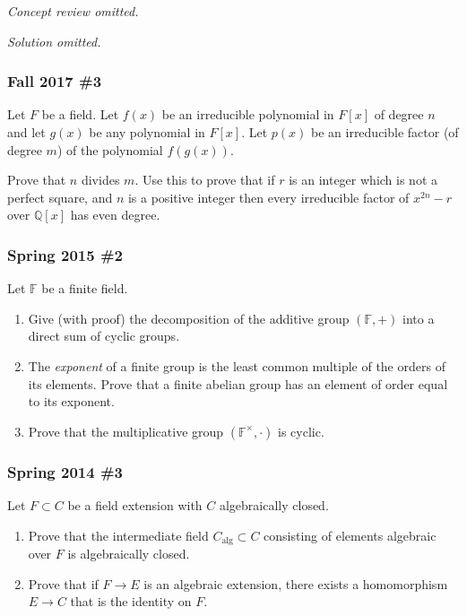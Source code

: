 \emph{Concept review omitted.}

\emph{Solution omitted.}

\hypertarget{fall-2017-3}{%
\subsubsection{Fall 2017 \#3}\label{fall-2017-3}}

Let \(F\) be a field. Let \(f(x)\) be an irreducible polynomial in
\(F[x]\) of degree \(n\) and let \(g(x)\) be any polynomial in \(F[x]\).
Let \(p(x)\) be an irreducible factor (of degree \(m\)) of the
polynomial \(f(g(x))\).

Prove that \(n\) divides \(m\). Use this to prove that if \(r\) is an
integer which is not a perfect square, and \(n\) is a positive integer
then every irreducible factor of \(x^{2n} - r\) over \({\mathbb{Q}}[x]\)
has even degree.

\hypertarget{spring-2015-2}{%
\subsubsection{Spring 2015 \#2}\label{spring-2015-2}}

Let \({\mathbb{F}}\) be a finite field.

\begin{enumerate}
\def\labelenumi{\alph{enumi}.}
\item
  Give (with proof) the decomposition of the additive group
  \(({\mathbb{F}}, +)\) into a direct sum of cyclic groups.
\item
  The \emph{exponent} of a finite group is the least common multiple of
  the orders of its elements. Prove that a finite abelian group has an
  element of order equal to its exponent.
\item
  Prove that the multiplicative group \(({\mathbb{F}}^{\times}, \cdot)\)
  is cyclic.
\end{enumerate}

\hypertarget{spring-2014-3}{%
\subsubsection{Spring 2014 \#3}\label{spring-2014-3}}

Let \(F\subset C\) be a field extension with \(C\) algebraically closed.

\begin{enumerate}
\def\labelenumi{\alph{enumi}.}
\item
  Prove that the intermediate field \(C_{\text{alg}} \subset C\)
  consisting of elements algebraic over \(F\) is algebraically closed.
\item
  Prove that if \(F\to E\) is an algebraic extension, there exists a
  homomorphism \(E\to C\) that is the identity on \(F\).
\end{enumerate}


